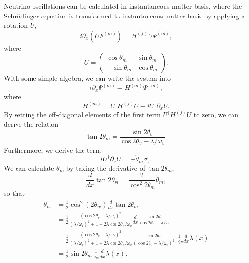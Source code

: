 Neutrino oscillations can be calculated in instantaneous matter basis, where the Schr\"{o}dinger equation is transformed to instantaneous matter basis by applying a rotation $U$,
\begin{equation}
    i \partial_x \left(  U\Psi^{(m)} \right)= H^{(f)} U\Psi^{(m)},
\end{equation}
where
\begin{equation}
    U = \begin{pmatrix} \cos \theta_m & \sin \theta_m \\ -\sin\theta_m & \cos \theta_m \end{pmatrix}.
\end{equation}
With some simple algebra, we can write the system into
\begin{equation}
    i \partial _x \Psi^{(m)} = H^{(m)}\Psi^{(m)} ,
\end{equation}
where
\begin{equation}
    H^{(m)} = U^\dagger H^{(f)} U - i U^\dagger \partial_x U.
\end{equation}
By setting the off-diagonal elements of the first term $U^\dagger H^{(f)} U$ to zero, we can derive the relation
\begin{equation}
   \tan 2\theta_m = \frac{\sin 2\theta_v}{\cos 2\theta_v - \lambda/\omega_v}.
\end{equation}
Furthermore, we derive the term
\begin{equation}
    i U^\dagger \partial_x U = - \dot\theta_m \sigma_2.
\end{equation}
We can calculate $\dot\theta_m$ by taking the derivative of $\tan 2\theta_m$,
\begin{equation}
    \frac{d}{dx} \tan 2\theta_m = \frac{2}{\cos^2 2\theta_m} \dot\theta_m,
\end{equation}
so that
\begin{align}
    \dot\theta_m &= \frac{1}{2} \cos^2 (2\theta_m) \frac{d}{dx} \tan 2\theta_m \\
   & = \frac{1}{2} \frac{(\cos 2\theta_v - \lambda/\omega_v)^2}{ (\lambda/\omega_v)^2 + 1 - 2\lambda \cos 2\theta_v /\omega_v } \frac{d}{dx} \frac{\sin 2\theta_v}{\cos 2\theta_v - \lambda/\omega_v} \\
   & = \frac{1}{2} \frac{(\cos 2\theta_v - \lambda/\omega_v)^2}{ (\lambda/\omega_v)^2 + 1 - 2\lambda \cos 2\theta_v /\omega_v }  \frac{\sin 2\theta_v}{(\cos 2\theta_v - \lambda/\omega_v)^2} \frac{1}{\omega)v} \frac{d}{dx} \lambda(x) \\
   & = \frac{1}{2} \sin 2\theta_m \frac{1}{\omega_m} \frac{d}{dx} \lambda(x).
\end{align}



